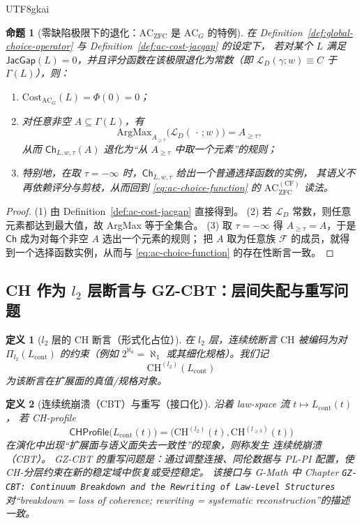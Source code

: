 \documentclass[12pt]{article}
\newtheorem{definition}{定义}[section]
\newtheorem{proposition}{命题}[section]
\newcommand{\JacGap}{\ensuremath{\mathsf{JacGap}}}
\newcommand{\ZFC}{\ensuremath{\mathrm{ZFC}}}
\newcommand{\AC}{\ensuremath{\mathrm{AC}}}
\newcommand{\CH}{\ensuremath{\mathrm{CH}}}
\begin{document}
\begin{CJK*}{UTF8}{gkai}
\begin{proposition}[零缺陷极限下的退化：$\AC_{\ZFC}$ 是 $\AC_G$ 的特例]
\label{prop:ac-zfc-as-degenerate-acg}
在 Definition~\ref{def:global-choice-operator} 与 Definition~\ref{def:ac-cost-jacgap} 的设定下，
若对某个 $L$ 满足 $\JacGap(L)=0$，并且评分函数在该极限退化为常数（即 $\mathcal{L}_D(\gamma;w)\equiv C$ 于 $\Gamma(L)$），则：
\begin{enumerate}
  \item $\mathrm{Cost}_{\AC_G}(L)=\Phi(0)=0$；
  \item 对任意非空 $A\subseteq\Gamma(L)$，有
        \[
          \mathrm{ArgMax}_{A_{\ge\tau}}\bigl(\mathcal{L}_D(\,\cdot\,;w)\bigr)=A_{\ge\tau},
        \]
        从而 $\mathsf{Ch}_{L,w,\tau}(A)$ 退化为“从 $A_{\ge\tau}$ 中取一个元素”的规则；
  \item 特别地，在取 $\tau=-\infty$ 时，$\mathsf{Ch}_{L,w,\tau}$ 给出一个普通选择函数的实例，
        其语义不再依赖评分与剪枝，从而回到 \eqref{eq:ac-choice-function} 的 $\AC_{\ZFC}^{(\mathrm{CF})}$ 读法。
\end{enumerate}
\end{proposition}

\begin{proof}
(1) 由 Definition~\ref{def:ac-cost-jacgap} 直接得到。
(2) 若 $\mathcal{L}_D$ 常数，则任意元素都达到最大值，故 ArgMax 等于全集合。
(3) 取 $\tau=-\infty$ 得 $A_{\ge\tau}=A$，于是 $\mathsf{Ch}$ 成为对每个非空 $A$ 选出一个元素的规则；
把 $A$ 取为任意族 $\mathcal{F}$ 的成员，就得到一个选择函数实例，从而与 \eqref{eq:ac-choice-function} 的存在性断言一致。
\end{proof}

\subsection{CH 作为 $l_2$ 层断言与 GZ-CBT：层间失配与重写问题}

\begin{definition}[$l_2$ 层的 CH 断言（形式化占位）]
\label{def:ch-l2}
在 $l_2$ 层，连续统断言 $\CH$ 被编码为对 $\Pi_{l_2}(L_{\mathrm{cont}})$ 的约束（例如
$2^{\aleph_0}=\aleph_1$ 或其细化规格）。我们记
\[
  \mathrm{CH}^{(l_2)}(L_{\mathrm{cont}})
\]
为该断言在扩展面的真值/规格对象。
\end{definition}

\begin{definition}[连续统崩溃（CBT）与重写（接口化）]
\label{def:cbt-interface}
沿着 law-space 流 $t\mapsto L_{\mathrm{cont}}(t)$，
若 CH-profile
\[
  \mathsf{CHProfile}\bigl(L_{\mathrm{cont}}(t)\bigr)
  =
  \bigl(\mathrm{CH}^{(l_2)}(t),\mathrm{CH}^{(l_{\ge 3})}(t)\bigr)
\]
在演化中出现“扩展面与语义面失去一致性”的现象，则称发生 \emph{连续统崩溃（CBT）}。
GZ-CBT 的\emph{重写问题}是：通过调整连接、同伦数据与 PL-PI 配置，使 CH-分层约束在新的稳定域中恢复或受控稳定。
该接口与 G-Math\cite{GaoZheng2025GFramework} 中 Chapter \texttt{GZ-CBT: Continuum Breakdown and the Rewriting of Law-Level
  Structures}
对“breakdown = loss of coherence; rewriting = systematic reconstruction”的描述一致。
\end{definition}


\end{CJK*}
\end{document}
